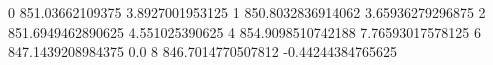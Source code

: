 0 851.03662109375 3.8927001953125
1 850.8032836914062 3.65936279296875
2 851.6949462890625 4.551025390625
4 854.9098510742188 7.76593017578125
6 847.1439208984375 0.0
8 846.7014770507812 -0.44244384765625
